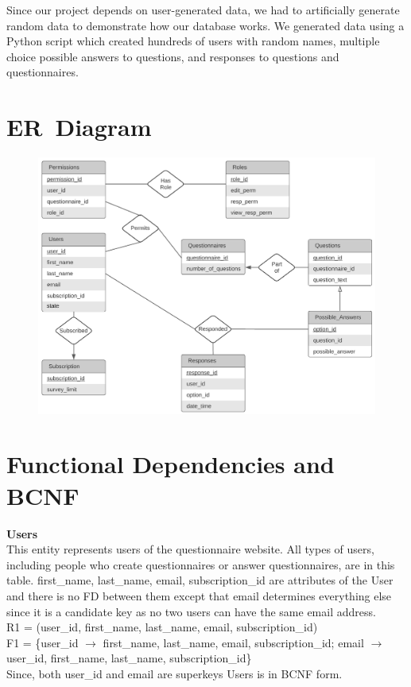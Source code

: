 \documentclass[12pt, oneside, a4paper]{article}
\newcommand{\tb}[1]{\textbf{#1}}
\begin{document}
    Since our project depends on user-generated data, we had to artificially generate random data to demonstrate how our database works. We generated data using a Python script which created hundreds of users with random names, multiple choice possible answers to questions, and responses to questions and questionnaires.
    \section{ER\ Diagram}
    \FloatBarrier
    \begin{figure}[H] 
        \centerline{
        \includegraphics[width=\textwidth]{newERdiagram.PNG}
        }
    \end{figure}
    \newpage
    \section{Functional Dependencies and BCNF}
    \tb{Users} \\
    This entity represents users of the questionnaire website.
    All types of users, including people who create questionnaires
    or answer questionnaires, are in this table. first\_name, last\_name, email, subscription\_id are attributes of the User and there is no FD between them except that email determines everything else since it is a candidate key as no two users can have the same email address. \\
    R1 = (user\_id, first\_name, last\_name, email, subscription\_id) \\
    F1 = \{user\_id \(\rightarrow\) first\_name, last\_name, email, subscription\_id; email \(\rightarrow\) user\_id, first\_name, last\_name, subscription\_id\} \\
    Since, both user\_id and email are superkeys Users is in BCNF form. 
    \\
\end{document}
